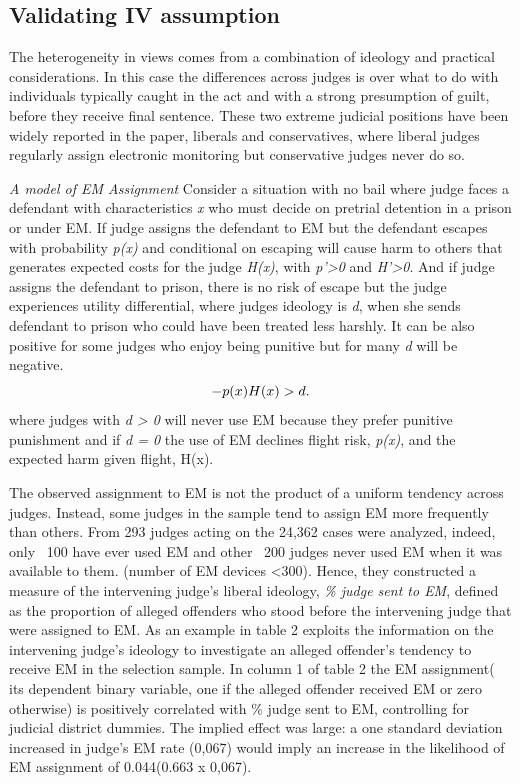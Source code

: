 \documentclass[a4paper,12pt]{article}
\begin{document}
\subsection{Validating IV assumption}
The heterogeneity in views comes from a combination of ideology and practical considerations. In this case the differences across judges is over what to do with individuals typically caught in the act and with a strong presumption of guilt, before they receive final sentence. These two extreme judicial positions have been widely reported in the paper, liberals and conservatives, where liberal judges regularly assign electronic monitoring but conservative judges never do so. 

\textit{A model of EM Assignment}
Consider a situation with no bail where judge faces a defendant with characteristics \textit{x} who must decide on pretrial detention in a prison or under EM. If judge assigns the defendant to EM but the defendant escapes with probability \textit{p(x)} and conditional on escaping will cause harm to others that generates expected costs for the judge \textit{H(x)}, with \textit{p'>0} and \textit{H'>0}. And if judge assigns the defendant to prison, there is no risk of escape but the judge experiences utility differential, where judges ideology is \textit{d}, when she sends defendant to prison who could have been treated less harshly. It can be also positive for some judges who enjoy being punitive but for many \textit{d} will be negative. 
\begin{equation}
    \centering
    - p(x)H(x) > d.
\end{equation}
where judges with \textit{d > 0} will never use EM because they prefer punitive punishment and if \textit{d = 0} the use of EM declines flight risk, \textit{p(x)}, and the expected harm given flight, H(x).  

The observed assignment to EM is not the product of a uniform tendency across judges. Instead, some judges in the sample tend to assign EM more frequently than others. From 293 judges acting on the 24,362 cases were analyzed, indeed, only ~100 have ever used EM and other ~200 judges never used EM when it was available to them. (number of EM devices <300). Hence, they constructed a measure of the intervening judge's liberal ideology, \textit{ \% judge sent to EM}, defined as the proportion of alleged offenders who stood before the intervening judge that were assigned to EM. 
As an example in table 2 exploits the information on the intervening judge's ideology to investigate an alleged offender's tendency to receive EM in the selection sample. In column 1 of table 2 the EM assignment( its dependent binary variable, one if the alleged offender received EM or zero otherwise) is positively correlated with \% judge sent to EM, controlling for judicial district dummies. The implied effect was large: a one standard deviation increased in judge's EM rate (0,067) would imply an increase in the likelihood of EM assignment of 0.044(0.663 x 0,067). 
\end{document}
